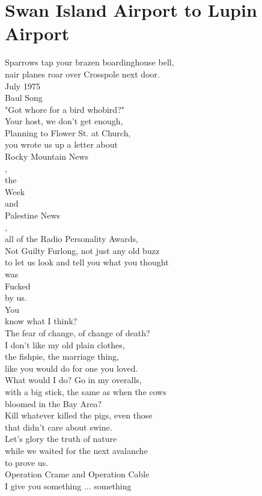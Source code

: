 \documentclass[smalldemyvopaper,11pt,twoside,onecolumn,openright,extrafontsizes]{memoir}
\begin{document}
\chapter{Swan Island Airport to Lupin Airport}
Sparrows tap your brazen boardinghouse bell,
\\nair planes roar over Crosspole next door.
\\July 1975
\\Baul Song
\\"Got whore for a bird whobird?"
\\Your host, we don't get enough,
\\Planning to Flower St. at Church,
\\you wrote us up a letter about
\\Rocky Mountain News
\\,
\\the
\\Week
\\and
\\Palestine News
\\,
\\all of the Radio Personality Awards,
\\Not Guilty Furlong, not just any old buzz
\\to let us look and tell you what you thought
\\was
\\Fucked
\\by us.
\\You
\\know what I think?
\\The fear of change, of change of death?
\\I don't like my old plain clothes,
\\the fishpie, the marriage thing,
\\like you would do for one you loved.
\\What would I do? Go in my overalls,
\\with a big stick, the same as when the cows
\\bloomed in the Bay Area?
\\Kill whatever killed the pigs, even those
\\that didn't care about swine.
\\Let's glory the truth of nature
\\while we waited for the next avalanche
\\to prove us.
\\Operation Crame and Operation Cable
\\I give you something ... something
\end{document}
